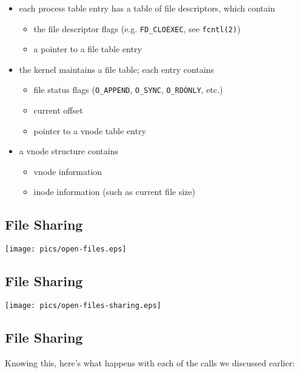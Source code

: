 \documentclass[xga]{xdvislides}
\begin{document}
\begin{itemize}
	\item each process table entry has a table of file descriptors, which
		contain
		\begin{itemize}
			\item the file descriptor flags (e.g. {\tt FD\_CLOEXEC}, see \verb+fcntl(2)+)
			\item a pointer to a file table entry
		\end{itemize}
	\item the kernel maintains a file table;  each entry contains
		\begin{itemize}
			\item file status flags (\verb+O_APPEND+, \verb+O_SYNC+, \verb+O_RDONLY+, etc.)
			\item current offset
			\item pointer to a vnode table entry
		\end{itemize}
	\item a vnode structure contains
		\begin{itemize}
			\item vnode information
			\item inode information (such as current file size)
		\end{itemize}
\end{itemize}

\subsection{File Sharing}
\begin{center}
\texttt{[image: pics/open-files.eps]} \\
\end{center}

\subsection{File Sharing}
\begin{center}
\texttt{[image: pics/open-files-sharing.eps]} \\
\end{center}


\subsection{File Sharing}
Knowing this, here's what happens with each of the calls we discussed earlier:
\end{document}
